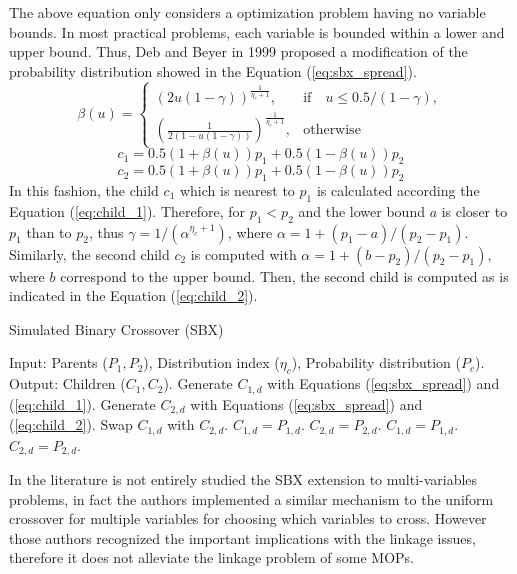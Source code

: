 The above equation only considers a optimization problem having no variable bounds.
%
In most practical problems, each variable is bounded within a lower and upper bound.
%
Thus, Deb and Beyer in 1999 \cite{deb1999self} proposed a modification of the probability distribution showed in the Equation (\ref{eq:sbx_spread}).
%
\begin{equation} \label{eq:sbx_spread}
    \beta(u)= 
\begin{cases}
     (2u(1-\gamma))^{\frac{1}{\eta_c+1}},& \text{if} \quad u \leq 0.5/(1-\gamma),\\
     	(\frac{1}{2(1-u(1-\gamma))})^{\frac{1}{\eta_c +1}} ,& \text{otherwise}
\end{cases}
\end{equation}
\begin{equation} \label{eq:child_1}
c_1 = 0.5(1 + \beta(u))p_1 + 0.5(1-\beta(u))p_2
\end{equation}
\begin{equation} \label{eq:child_2}
c_2 = 0.5(1 + \beta(u))p_1 + 0.5(1-\beta(u))p_2
\end{equation}
In this fashion, the child $c_1$ which is nearest to $p_1$ is calculated according the Equation (\ref{eq:child_1}).
%
Therefore, for $p_1 < p_2$ and the lower bound $a$ is closer to $p_1$ than to $p_2$, thus $\gamma = 1/(\alpha^{\eta_c + 1})$, where $\alpha = 1 + (p_1 - a) / (p_2 - p_1)$.
%
Similarly, the second child $c_2$ is computed with $\alpha = 1 + (b-p_2)/(p_2 - p_1)$, where $b$ correspond to the upper bound.
%
Then, the second child is computed as is indicated in the Equation (\ref{eq:child_2}).
\begin{algorithm}[t]
\scriptsize
\caption{Simulated Binary Crossover (SBX)}
\label{alg:SBX_Operator}
\begin{algorithmic}[1]
    \STATE Input: Parents ($P_{1}, P_{2}$), Distribution index ($\eta_c$), Probability distribution ($P_c$).
    \STATE Output: Children ($C_{1}, C_{2}$).
	 \label{alg:inherit_variable}
		\STATE Generate $C_{1,d}$ with Equations (\ref{eq:sbx_spread}) and (\ref{eq:child_1}).
		\STATE Generate $C_{2,d}$ with Equations (\ref{eq:sbx_spread}) and (\ref{eq:child_2}).
			\STATE Swap $C_{1,d}$ with $C_{2,d}$.
		 \ENDIF
        \ELSE
	   \STATE $C_{1,d} = P_{1, d}$.
	   \STATE $C_{2,d} = P_{2, d}$.
        \ENDIF
       \ENDFOR
    \ELSE
	\STATE $C_{1,d} = P_{1,d}$.
	\STATE $C_{2,d} = P_{2,d}$.
    \ENDIF
\end{algorithmic}
\end{algorithm}
In the literature \cite{Joel:SBX1994} is not entirely studied the SBX extension to multi-variables problems, in fact the authors implemented a similar mechanism to the uniform crossover for multiple variables \cite{Joel:UNDX} for choosing which variables to cross.
%
However those authors recognized the important implications with the linkage issues, therefore it does not alleviate the linkage problem of some MOPs.
%

